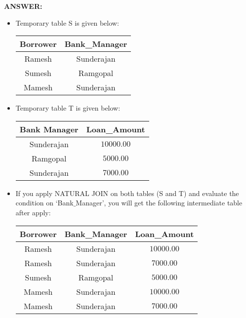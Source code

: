 \documentclass[10pt]{article}
\newcommand{\lightrule}{%
	\arrayrulecolor{black!30}%
	\midrule[\lightrulewidth]%
	\arrayrulecolor{black}}
\begin{document}
\begin{itemize}
			\color{red} \textbf{ANSWER:} \color{black} 
			\begin{itemize}
				\item Temporary table S is given below:
					\begin{center}
						\centering
						\begin{tabular}{@{} *{2}{c} @{}}
							\toprule
								\textbf{Borrower} & \textbf{Bank\_Manager} \\
							\midrule
								Ramesh & Sunderajan \\ 
							\lightrule
								Sumesh & Ramgopal \\ 
							\lightrule
								Mamesh & Sunderajan \\ 
							\bottomrule
						\end{tabular}
					\end{center}

				\item Temporary table T is given below:
					\begin{center}
						\centering
						\begin{tabular}{@{} *{2}{c} @{}}
							\toprule
								\textbf{Bank Manager} & \textbf{Loan\_Amount} \\
							\midrule
								Sunderajan & $10000.00$ \\ 
							\lightrule
								Ramgopal & $5000.00$ \\ 
							\lightrule
								Sunderajan & $7000.00$ \\ 
							\bottomrule
						\end{tabular}
					\end{center}

				\item If you apply NATURAL JOIN on both tables (S and T) and evaluate the condition on ‘Bank$\_$Manager’, you will get the following intermediate table after apply:
					\begin{center}
						\centering
						\begin{tabular}{@{} *{3}{c} @{}}
							\toprule
								\textbf{Borrower} & \textbf{Bank\_Manager} & \textbf{Loan\_Amount} \\
							\midrule
								Ramesh & Sunderajan & $10000.00$ \\ 
							\lightrule
								Ramesh & Sunderajan & $7000.00$ \\ 
							\lightrule
								Sumesh & Ramgopal & $5000.00$ \\ 
							\lightrule
								Mamesh & Sunderajan & $10000.00$ \\ 
							\lightrule
								Mamesh & Sunderajan & $7000.00$ \\ 
							\bottomrule
						\end{tabular}
					\end{center}


\end{itemize}
\end{itemize}
\end{document}
